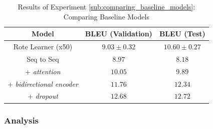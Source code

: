 \begin{table}[!ht]
\begin{center}
\begin{tabular}{ c | c | c }
    Model                             & BLEU (Validation)  & BLEU (Test)    \\
    \hline
    Rote Learner (x50)                & $ 9.03 \pm  0.32 $ & $ 10.60 \pm 0.27 $   \\
    \hline
    Seq to Seq                        & $ 8.97 $ & $ 8.18 $ \\
    + \textit{attention}              & $ 10.05 $ & $ 9.89 $  \\
    + \textit{bidirectional encoder}  & $ 11.76 $ & $ 12.34 $  \\
    + \textit{dropout}                & $ 12.68 $ & $ 12.72 $  \\
    \hline

\end{tabular}
\caption {Results of Experiment \ref{sub:comparing_baseline_models}: Comparing Baseline Models }
\label{table:name_baseline}
\end{center}
\end{table}



\subsubsection{Analysis} %

